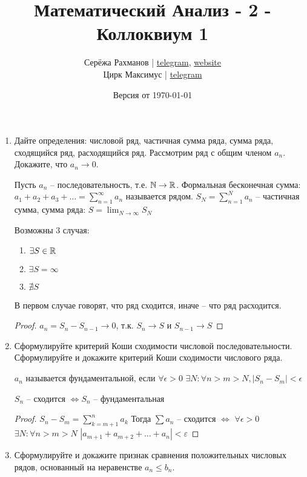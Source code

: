 \documentclass[a4paper]{article}
\title{\Huge Математический Анализ - 2 - Коллоквиум 1}
\author{
    Серёжа Рахманов | \href{https://t.me/virg1n}{telegram}, \href{http://shoraii.github.io}{website}
    \\
    Цирк Максимус | \href{https://t.me/ultrakekul}{telegram}

}
\date{Версия от {\ddmmyyyydate\today} \currenttime}
\begin{document}
    \maketitle

    \begin{enumerate}
        \item Дайте определения: числовой ряд, частичная сумма ряда, сумма ряда, сходящийся ряд, расходящийся ряд. Рассмотрим ряд с общим членом $a_n$. Докажите, что $a_n \to 0$.
        \begin{definition}
        Пусть $a_{n}$ -- последовательность, т.е. $\mathbb{N} \rightarrow \mathbb{R}$. Формальная бесконечная сумма: $a_1 + a_2 + a_3 + \dots = \sum_{n=1}^{\infty} a_n$ называется рядом.
        $S_N = \sum_{n = 1}^{N} a_n$ -- частичная сумма, сумма ряда: $S = \lim_{N \rightarrow \infty} S_N$
        \end{definition}
        
        Возможны 3 случая:
        \begin{enumerate}
            \item $\exists S \in \mathbb{R}$
            \item $\exists S = \infty$
            \item $\nexists S$
        \end{enumerate}
        
        В первом случае говорят, что ряд сходится, иначе -- что ряд расходится.

        \begin{comment}~
            Если ряд сходится, то $a_n \rightarrow 0$
        \end{comment}
        \begin{proof}
            $a_n = S_n - S_{n - 1} \rightarrow 0$, т.к. $S_n \rightarrow S$ и $S_{n - 1} \rightarrow S$
        \end{proof}
        \item Сформулируйте критерий Коши сходимости числовой последовательности. Сформулируйте и докажите критерий Коши сходимости числового ряда.
        \begin{definition}
            ${a_n}$ называется фундаментальной, если $\forall \epsilon > 0$  $\exists N: \forall n > m > N, |S_n - S_m| < \epsilon$
        \end{definition}
        \begin{theorem}
            ${S_n}$ -- сходится $\Leftrightarrow {S_n}$ -- фундаментальная
        \end{theorem}
        \begin{proof}
        $S_n - S_m = \sum_{k = m + 1}^{n} a_{k}$
        Тогда $\sum a_n$ -- сходится $\Leftrightarrow$ $\forall \epsilon > 0$  $\exists N: \forall n > m > N$
        $|a_{m + 1} + a_{m + 2} + \dots + a_{n}| < \varepsilon$
        \end{proof}
        \item Сформулируйте и докажите признак сравнения положительных числовых рядов, основанный на неравенстве $a_n \leq b_n$.
        

\end{enumerate}
\end{document}
